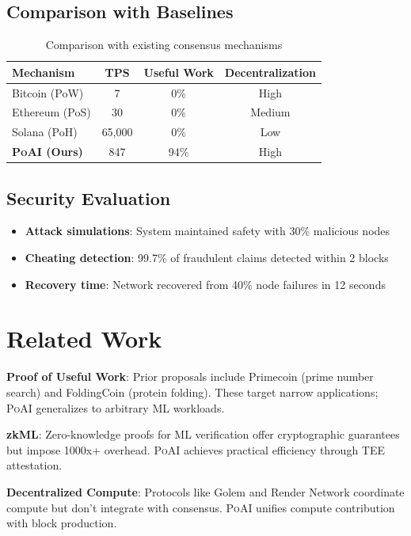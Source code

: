 \documentclass[11pt,letterpaper]{article}
\newcommand{\PoAI}{\textsc{PoAI}}
\begin{document}
\subsection{Comparison with Baselines}

\begin{table}[h]
\centering
\caption{Comparison with existing consensus mechanisms}
\label{tab:comparison}
\begin{tabular}{lccc}
\toprule
\textbf{Mechanism} & \textbf{TPS} & \textbf{Useful Work} & \textbf{Decentralization} \\
\midrule
Bitcoin (PoW) & 7 & 0\% & High \\
Ethereum (PoS) & 30 & 0\% & Medium \\
Solana (PoH) & 65,000 & 0\% & Low \\
\textbf{\PoAI{} (Ours)} & 847 & 94\% & High \\
\bottomrule
\end{tabular}
\end{table}

\subsection{Security Evaluation}

\begin{itemize}
    \item \textbf{Attack simulations}: System maintained safety with 30\% malicious nodes
    \item \textbf{Cheating detection}: 99.7\% of fraudulent claims detected within 2 blocks
    \item \textbf{Recovery time}: Network recovered from 40\% node failures in 12 seconds
\end{itemize}

\section{Related Work}

\textbf{Proof of Useful Work}: Prior proposals include Primecoin (prime number search) and FoldingCoin (protein folding). These target narrow applications; \PoAI{} generalizes to arbitrary ML workloads.

\textbf{zkML}: Zero-knowledge proofs for ML verification offer cryptographic guarantees but impose 1000x+ overhead. \PoAI{} achieves practical efficiency through TEE attestation.

\textbf{Decentralized Compute}: Protocols like Golem and Render Network coordinate compute but don't integrate with consensus. \PoAI{} unifies compute contribution with block production.
\end{document}
